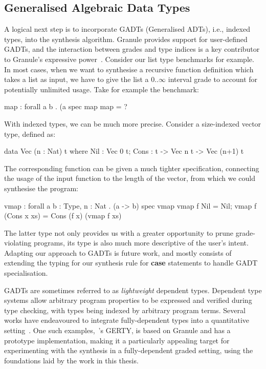 \subsection{Generalised Algebraic Data Types}
A logical next step is to incorporate GADTs (Generalised ADTs), i.e., indexed
types,  into the synthesis algorithm. Granule provides support for user-defined
GADTs, and the interaction between grades and type indices is a key contributor
to Granule's expressive power~\citep{DBLP:journals/pacmpl/OrchardLE19}. Consider
our list type benchmarks for example. In most cases, when we want to synthesise
a recursive function definition which takes a list as input, we have to give the
list a $0..\infty$ interval grade to account for potentially unlimited usage.
Take for example the  benchmark:
\begin{granule}
map : forall a b . (a %
spec
    map %
map = ?
\end{granule}
With indexed types, we can be much more precise. Consider a size-indexed vector type,
defined as:
\begin{granule}
data Vec (n : Nat) t where
  Nil  : Vec 0 t;
  Cons : t -> Vec n t -> Vec (n+1) t
\end{granule}
%
The corresponding  function
can be given a much tighter specification, connecting the usage of the
input function to the length of the vector, from which we could
synthesise the program:
\begin{granule}
vmap : forall {a b : Type, n : Nat} . (a -> b) %
spec
    vmap %
vmap f Nil = Nil;
vmap f (Cons x xs) = Cons (f x) (vmap f xs)
\end{granule}
The latter type not only provides us with a greater opportunity to prune
grade-violating programs, its type is also much more descriptive of the user's
intent. Adapting our approach to GADTs is future work, and mostly consists of
extending the typing for our synthesis rule for \textbf{case} statements to
handle GADT specialisation.

GADTs are sometimes referred to as \emph{lightweight} dependent types. Dependent
type systems allow arbitrary program properties to be expressed and verified
during type checking, with types being indexed by arbitrary program terms.
Several works have endeavoured to integrate fully-dependent types into a
quantitative setting~\citep{DBLP:journals/pacmpl/ChoudhuryEEW21,
10.1145/3607862, McBride2016, 10.1145/2676726.2676969}. One such
examples,~\citet{DBLP:conf/esop/MoonEO21}'s \textsc{GERTY}, is based on Granule
and has a prototype implementation, making it a particularly appealing target
for experimenting with the synthesis in a fully-dependent graded setting, using
the foundations laid by the work in this thesis.


